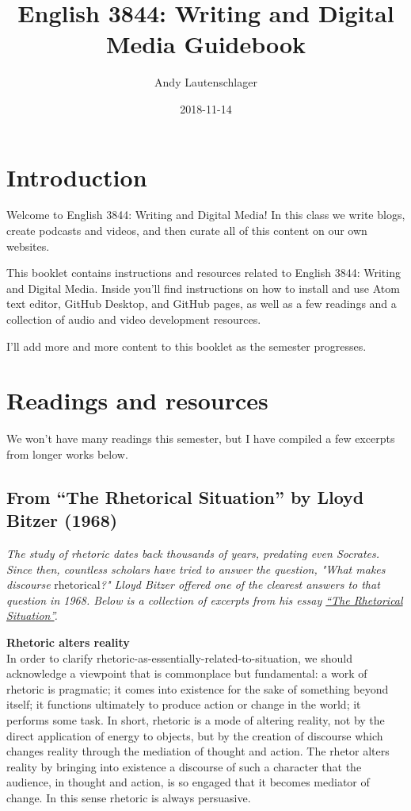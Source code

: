 \documentclass[]{book}
\title{English 3844: Writing and Digital Media Guidebook}
\author{Andy Lautenschlager}
\date{2018-11-14}
\theoremstyle{definition}
\theoremstyle{definition}
\theoremstyle{definition}
\theoremstyle{remark}
\begin{document}
\maketitle

{
\setcounter{tocdepth}{1}
\tableofcontents
}
\hypertarget{introduction}{%
\chapter{Introduction}\label{introduction}}

Welcome to English 3844: Writing and Digital Media! In this class we
write blogs, create podcasts and videos, and then curate all of this
content on our own websites.

This booklet contains instructions and resources related to English
3844: Writing and Digital Media. Inside you'll find instructions on how
to install and use Atom text editor, GitHub Desktop, and GitHub pages,
as well as a few readings and a collection of audio and video
development resources.

I'll add more and more content to this booklet as the semester
progresses.

\hypertarget{readings}{%
\chapter{Readings and resources}\label{readings}}

We won't have many readings this semester, but I have compiled a few
excerpts from longer works below.

\hypertarget{from-the-rhetorical-situation-by-lloyd-bitzer-1968}{%
\section{From ``The Rhetorical Situation'' by Lloyd Bitzer
(1968)}\label{from-the-rhetorical-situation-by-lloyd-bitzer-1968}}

\emph{The study of rhetoric dates back thousands of years, predating
even Socrates. Since then, countless scholars have tried to answer the
question, "What makes discourse} rhetorical\emph{?" Lloyd Bitzer offered
one of the clearest answers to that question in 1968. Below is a
collection of excerpts from his essay
\href{http://www.arts.uwaterloo.ca/~raha/309CWeb/Bitzer(1968).pdf}{``The
Rhetorical Situation''}.}

\textbf{Rhetoric alters reality}\\
In order to clarify rhetoric-as-essentially-related-to-situation, we
should acknowledge a viewpoint that is commonplace but fundamental: a
work of rhetoric is pragmatic; it comes into existence for the sake of
something beyond itself; it functions ultimately to produce action or
change in the world; it performs some task. In short, rhetoric is a mode
of altering reality, not by the direct application of energy to objects,
but by the creation of discourse which changes reality through the
mediation of thought and action. The rhetor alters reality by bringing
into existence a discourse of such a character that the audience, in
thought and action, is so engaged that it becomes mediator of change. In
this sense rhetoric is always persuasive.
\end{document}
